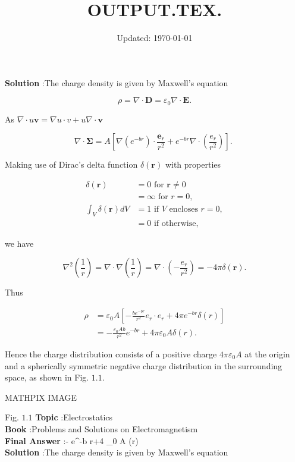 \documentclass[10pt]{article}
\title{OUTPUT.TEX.}
\date{Updated: \today}
\author{}
\begin{document}
\textbf{Solution} :The charge density is given by Maxwell's equation

$$
\rho=\nabla \cdot \mathbf{D}=\varepsilon_{0} \nabla \cdot \mathbf{E} .
$$

As $\nabla \cdot u \mathbf{v}=\nabla u \cdot v+u \nabla \cdot \mathbf{v}$

$$
\nabla \cdot \mathbf{\Sigma}=A\left[\nabla\left(e^{-b r}\right) \cdot \frac{\mathbf{e}_{r}}{r^{2}}+e^{-b r} \nabla \cdot\left(\frac{e_{r}}{r^{2}}\right)\right] \text {. }
$$

Making use of Dirac's delta function $\delta(\mathbf{r})$ with properties

$$
\begin{aligned}
\delta(\mathbf{r}) &=0 \text { for } \mathbf{r} \neq 0 \\
&=\infty \text { for } r=0, \\
\int_{V} \delta(\mathbf{r}) d V &=1 \text { if } V \text { encloses } r=0, \\
&=0 \text { if otherwise, }
\end{aligned}
$$

we have

$$
\nabla^{2}\left(\frac{1}{r}\right)=\nabla \cdot \nabla\left(\frac{1}{r}\right)=\nabla \cdot\left(-\frac{e_{r}}{r^{2}}\right)=-4 \pi \delta(\mathbf{r}) .
$$

Thus

$$
\begin{aligned}
\rho &=\varepsilon_{0} A\left[-\frac{b e^{-b r}}{r^{2}} e_{r} \cdot e_{r}+4 \pi e^{-b r} \delta(r)\right] \\
&=-\frac{\varepsilon_{0} A b}{r^{2}} e^{-b r}+4 \pi \varepsilon_{0} A \delta(r) .
\end{aligned}
$$

Hence the charge distribution consists of a positive charge $4 \pi \varepsilon_{0} A$ at the origin and a spherically symmetric negative charge distribution in the surrounding space, as shown in Fig. $1.1$.

MATHPIX IMAGE

Fig. $1.1$
\textbf{Topic} :Electrostatics\\
\textbf{Book} :Problems and Solutions on Electromagnetism\\
\textbf{Final Answer} :- e^{-b r}+4 \pi \varepsilon_{0} A \delta(r)\\


\textbf{Solution} :The charge density is given by Maxwell's equation
\end{document}
